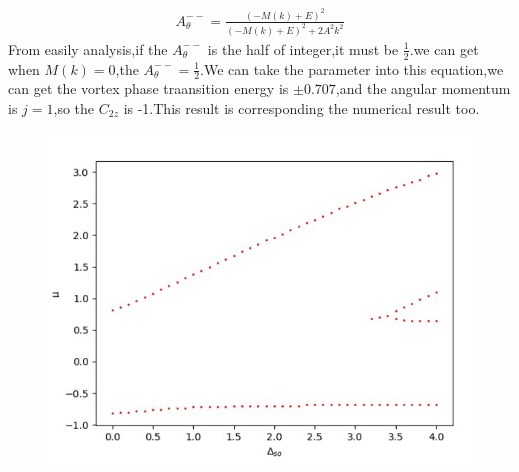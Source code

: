 \documentclass[4pt]{article}
\begin{document}
\begin{align}
	A_{\theta}^{--}=\frac{(-M(k)+E)^2}{(-M(k)+E)^2+2A^2k^2}
\end{align}
From easily analysis,if the  $A_{\theta}^{--}$ is the half of integer,it must be $\frac{1}{2}$.we can get when $M(k)=0$,the  $A_{\theta}^{--}=\frac{1}{2}$.We can take the parameter into this equation,we can get the vortex phase traansition energy is $\pm 0.707$,and the angular momentum is $j=1$,so the $C_{2z}$ is -1.This result is  corresponding the numerical result too.
\begin{figure}[H]
	\centering
	\includegraphics[scale=0.6]{figure/6}
\end{figure}
\end{document}
